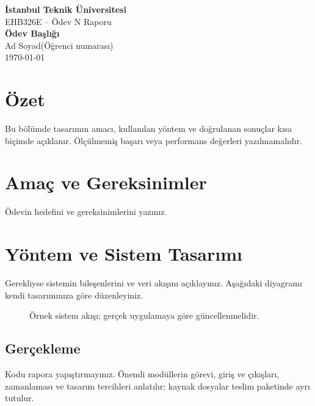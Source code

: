 \documentclass[12pt,a4paper]{article}
\newcommand{\ogrenciad}{Ad Soyad}
\newcommand{\ogrencino}{Öğrenci numarası}
\newcommand{\raporbasligi}{Ödev Başlığı}
\begin{document}
\begin{center}
{\Large\bfseries İstanbul Teknik Üniversitesi}\\[5pt]
{\large EHB326E -- Ödev N Raporu}\\[18pt]
{\LARGE\bfseries\color{baslik}\raporbasligi}\\[15pt]
\ogrenciad\quad(\ogrencino)\\[5pt]
\today
\end{center}
\vspace{1em}
\section{Özet}
Bu bölümde tasarımın amacı, kullanılan yöntem ve doğrulanan sonuçlar kısa biçimde açıklanır. Ölçülmemiş başarı veya performans değerleri yazılmamalıdır.

\section{Amaç ve Gereksinimler}
Ödevin hedefini ve gereksinimlerini yazınız.

\section{Yöntem ve Sistem Tasarımı}
Gerekliyse sistemin bileşenlerini ve veri akışını açıklayınız. Aşağıdaki diyagramı kendi tasarımınıza göre düzenleyiniz.

\begin{figure}[htbp]\centering
{}
\caption{Örnek sistem akışı; gerçek uygulamaya göre güncellenmelidir.}
\label{fig:akis}
\end{figure}

\subsection{Gerçekleme}
Kodu rapora yapıştırmayınız. Önemli modüllerin görevi, giriş ve çıkışları, zamanlaması ve tasarım tercihleri anlatılır; kaynak dosyalar teslim paketinde ayrı tutulur.
\end{document}
